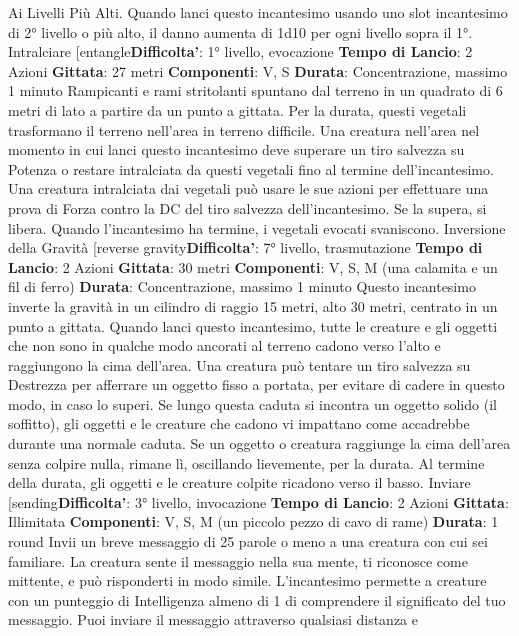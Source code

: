 \begin{multicols}{2}
Ai Livelli Più Alti. Quando lanci questo incantesimo
usando uno slot incantesimo di 2° livello o più alto, il
danno aumenta di 1d10 per ogni livello sopra il 1°.
Intralciare
[entangle\textbf{Difficolta'}:
1° livello, evocazione
\textbf{Tempo di Lancio}: 2 Azioni
\textbf{Gittata}: 27 metri
\textbf{Componenti}: V, S
\textbf{Durata}: Concentrazione, massimo 1 minuto
Rampicanti e rami stritolanti spuntano dal terreno in un
quadrato di 6 metri di lato a partire da un punto a
gittata. Per la durata, questi vegetali trasformano il
terreno nell’area in terreno difficile.
Una creatura nell’area nel momento in cui lanci questo
incantesimo deve superare un tiro salvezza su Potenza o
restare intralciata da questi vegetali fino al termine
dell’incantesimo. Una creatura intralciata dai vegetali
può usare le sue azioni per effettuare una prova di
Forza contro la DC del tiro salvezza dell’incantesimo.
Se la supera, si libera.
Quando l’incantesimo ha termine, i vegetali evocati
svaniscono.
Inversione della Gravità
[reverse gravity\textbf{Difficolta'}:
7° livello, trasmutazione
\textbf{Tempo di Lancio}: 2 Azioni
\textbf{Gittata}: 30 metri
\textbf{Componenti}: V, S, M (una calamita e un fil di ferro)
\textbf{Durata}: Concentrazione, massimo 1 minuto
Questo incantesimo inverte la gravità in un cilindro di
raggio 15 metri, alto 30 metri, centrato in un punto a
gittata. Quando lanci questo incantesimo, tutte le
creature e gli oggetti che non sono in qualche modo
ancorati al terreno cadono verso l’alto e raggiungono la
cima dell’area. Una creatura può tentare un tiro
salvezza su Destrezza per afferrare un oggetto fisso a
portata, per evitare di cadere in questo modo, in caso lo
superi.
Se lungo questa caduta si incontra un oggetto solido (il
soffitto), gli oggetti e le creature che cadono vi
impattano come accadrebbe durante una normale
caduta. Se un oggetto o creatura raggiunge la cima
dell’area senza colpire nulla, rimane lì, oscillando
lievemente, per la durata.
Al termine della durata, gli oggetti e le creature colpite
ricadono verso il basso.
Inviare
[sending\textbf{Difficolta'}:
3° livello, invocazione
\textbf{Tempo di Lancio}: 2 Azioni
\textbf{Gittata}: Illimitata
\textbf{Componenti}: V, S, M (un piccolo pezzo di cavo di
rame)
\textbf{Durata}: 1 round
Invii un breve messaggio di 25 parole o meno a una
creatura con cui sei familiare. La creatura sente il
messaggio nella sua mente, ti riconosce come mittente,
e può risponderti in modo simile. L’incantesimo
permette a creature con un punteggio di Intelligenza
almeno di 1 di comprendere il significato del tuo
messaggio.
Puoi inviare il messaggio attraverso qualsiasi distanza e

\end{multicols}
